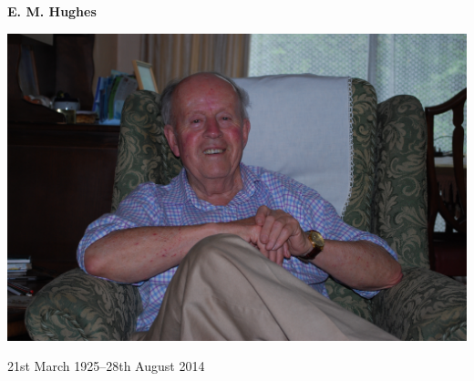 \documentclass[10pt,twoside]{article}
\begin{document}
\thispagestyle{plain}

\begin{tcolorbox}
\centering  
{\huge\bfseries E. M. Hughes}

\includegraphics[width=\textwidth]{grandadSummer2008}

\centering
\large 21st March 1925--28th August 2014
\end{tcolorbox}



\end{document}
